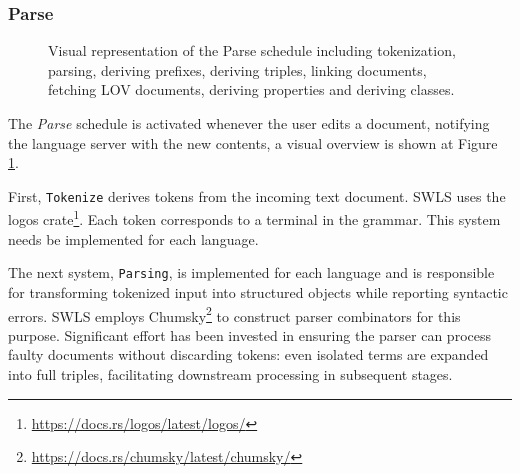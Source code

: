 \subsubsection{Parse}

\begin{figure}[tb]
 \centering
  \caption{Visual representation of the Parse schedule including tokenization, parsing, deriving prefixes, deriving triples, linking documents, fetching LOV documents, deriving properties and deriving classes. }\label{fig:Parse}
\end{figure}

The \textit{Parse} schedule is activated whenever the user edits a document, notifying the language server with the new contents, a visual overview is shown at Figure \ref{fig:Parse}.

First, \texttt{Tokenize} derives tokens from the incoming text document. SWLS uses the logos crate\footnote{\url{https://docs.rs/logos/latest/logos/}}. 
Each token corresponds to a terminal in the grammar. This system needs be implemented for each language.

The next system, \texttt{Parsing}, is implemented for each language and is responsible for transforming tokenized input into structured objects while reporting syntactic errors. 
SWLS employs Chumsky\footnote{\url{https://docs.rs/chumsky/latest/chumsky/}} to construct parser combinators for this purpose.
Significant effort has been invested in ensuring the parser can process faulty documents without discarding tokens: even isolated terms are expanded into full triples, facilitating downstream processing in subsequent stages.

